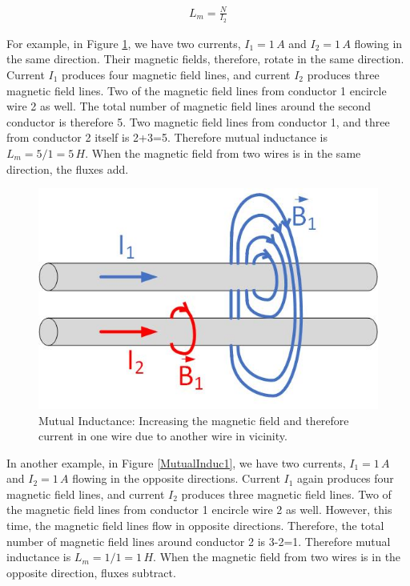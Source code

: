 \documentclass{ximera}
\begin{document}
 \begin{eqnarray}
 L_m=\frac{N}{I_2}
 \end{eqnarray}
 
 For example, in Figure \ref{MutualInduc2}, we have two currents, $I_1=1\,A$ and $I_2=1\,A$ flowing in the same direction. Their magnetic fields, therefore, rotate in the same direction. Current $I_1$ produces four magnetic field lines, and current $I_2$ produces three magnetic field lines. Two of the magnetic field lines from conductor 1 encircle wire 2 as well. The total number of magnetic field lines around the second conductor is therefore 5. Two magnetic field lines from conductor 1, and three from conductor 2 itself is 2+3=5. Therefore mutual inductance is $L_m=5/1=5\,H.$ When the magnetic field from two wires is in the same direction, the fluxes add.


\begin{figure}[htbp]
\begin{center}
\includegraphics[scale=0.5]{../jpg/inductanceCurrentSameDir1.jpg}
\end{center}
\caption{Mutual Inductance: Increasing the magnetic field and therefore current in one wire due to another wire in vicinity. }
\label{MutualInduc2}
\end{figure}


In another example, in Figure \ref{MutualInduc1}, we have two currents, $I_1=1\,A$ and $I_2=1\,A$ flowing in the opposite directions. Current $I_1$ again produces four magnetic field lines, and current $I_2$ produces three magnetic field lines. Two of the magnetic field lines from conductor 1 encircle wire 2 as well. However, this time, the magnetic field lines flow in opposite directions. Therefore, the total number of magnetic field lines around conductor  2 is 3-2=1.  Therefore mutual inductance is $L_m=1/1=1\,H.$  When the magnetic field from two wires is in the opposite direction, fluxes subtract.
\end{document}
